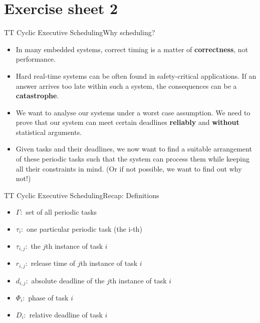 
\section{Exercise sheet 2}

\setcounter{task}{1}

\begin{frame}{TT Cyclic Executive Scheduling}{Why scheduling?}
    \begin{itemize}
        \item In many embedded systems, correct timing is a matter of \textbf{correctness}, not performance.
        \item Hard real-time systems can be often found in safety-critical applications. If an answer arrives too late within such a system, the consequences can be a \textbf{catastrophe}.
        \item We want to analyse our systems under a worst case assumption. We need to prove that our system can meet certain deadlines \textbf{reliably} and \textbf{without} statistical arguments.
        \item Given tasks and their deadlines, we now want to find a suitable arrangement of these periodic tasks such that the system can process them while keeping all their constraints in mind. (Or if not possible, we want to find out why not!)
    \end{itemize}
\end{frame}

\begin{frame}{TT Cyclic Executive Scheduling}{Recap: Definitions}
    \begin{itemize}
        \item $\Gamma:$ set of all periodic tasks
        \item $\tau_i:$ one particular periodic task (the i-th)
        \item $\tau_{i,j}:$ the $j$th instance of task $i$
        \item $r_{i,j}:$ release time of $j$th instance of task $i$
        \item $d_{i,j}:$ absolute deadline of the $j$th instance of task $i$
        \item $\Phi_i:$ phase of task $i$
        \item $D_i:$ relative deadline of task $i$
    \end{itemize}
\end{frame}

